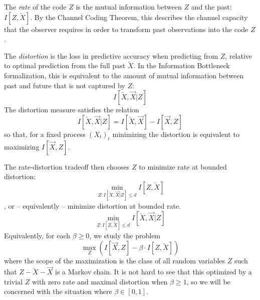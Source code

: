\documentclass[11pt,letterpaper]{article}
\begin{document}
The \emph{rate} of the code $Z$ is the mutual information between $Z$ and the past: $I[Z, \overleftarrow{X}]$.
By the Channel Coding Theorem, this describes the channel capacity that the observer requires in order to transform past observations into the code $Z$.

The \emph{distortion} is the loss in predictive accuracy when predicting from $Z$, relative to optimal prediction from the full past $\overleftarrow{X}$.
In the Information Bottleneck formalization, this
is equivalent to the amount of mutual information between past and future that is not captured by $Z$:
\begin{equation}
	I[\overleftarrow{X}, \overrightarrow{X}|Z]
\end{equation}
The distortion measure satisfies the relation
\begin{equation}
	I[\overleftarrow{X}, \overrightarrow{X}|Z] = I[\overleftarrow{X}, \overrightarrow{X}] - I[\overrightarrow{X}, Z]
\end{equation}
so that, for a fixed process $(X_t)_t$ minimizing the distortion is equivalent to maximizing $I[\overrightarrow{X}, Z]$.

The rate-distortion tradeoff then chooses $Z$ to minimize rate at bounded distortion:
$$\min_{Z : I[\overleftarrow{X}, \overrightarrow{X}|Z] \leq d} I[Z, \overleftarrow{X}]$$
, or -- equivalently -- minimize distortion at bounded rate.
$$\min_{Z :  I[Z, \overleftarrow{X}] \leq d}  I[\overleftarrow{X}, \overrightarrow{X}|Z] $$
Equivalently, for each  $\beta \geq 0$, we study the problem 
\begin{equation}\label{eq:ib}
	\max_{Z} \left( I[\overrightarrow{X}, Z] - \beta \cdot I[Z, \overleftarrow{X}] \right)
\end{equation}
where the scope of the maximization is the class of all random variables $Z$ such that $Z - \overleftarrow{X} - \overrightarrow{X}$ is a Markov chain. %
It is not hard to see that this optimized by a trivial $Z$ with zero rate and maximal distortion when $\beta \geq 1$, so we will be concerned with the situation where $\beta \in [0,1]$.
\end{document}
